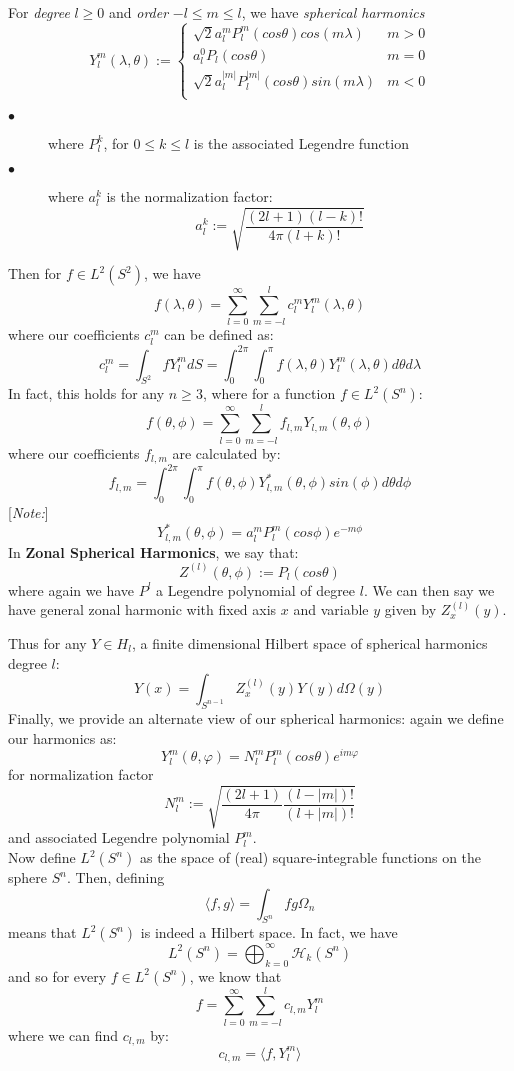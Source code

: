 \documentclass[12pt, leqno]{article}
\theoremstyle{plain}
\begin{document}
For \textit{degree} $l \geq 0$ and \textit{order} $-l \leq m \leq l$, we have \textit{spherical harmonics}
\[
Y^m_l(\lambda, \theta) := 
\begin{cases}
\sqrt{2}a^m_l P^m_l(cos \theta)cos(m\lambda) & m > 0\\
a^0_l P_l(cos \theta) & m = 0\\
\sqrt{2}a^{|m|}_l P^{|m|}_l(cos \theta)sin(m\lambda) & m < 0\\
\end{cases}
\]
\begin{description}
\item[$\bullet$] where $P^k_l$, for $0 \leq k \leq l$ is the associated Legendre function

\item[$\bullet$] where $a^k_l$ is the normalization factor:
\[
a^k_l := \sqrt{\frac{(2l+1)(l - k)!}{4\pi(l+k)!}}
\]
\end{description}

Then for $f \in L^2(S^2)$, we have
\[
f(\lambda, \theta) = \sum_{l = 0}^\infty \sum_{m = -l}^l c^m_l Y^m_l(\lambda, \theta)
\]
where our coefficients $c^m_l$ can be defined as:
\[
c^m_l = \int_{S^2}f Y^m_l dS = \int_0^{2\pi} \int_0^\pi f(\lambda, \theta)Y^m_l(\lambda, \theta)d\theta d\lambda
\]
In fact, this holds for any $n \geq 3$, where for a function $f \in L^2(S^n)$:
\[
f(\theta, \phi) = \sum_{l = 0}^\infty \sum_{m = -l}^l f_{l, m} Y_{l, m}(\theta, \phi)
\]
where our coefficients $f_{l, m}$ are calculated by:
\[
f_{l, m} = \int_0^{2\pi} \int_0^{\pi}f(\theta, \phi)Y^*_{l, m}(\theta, \phi)sin(\phi)d\theta d\phi
\]
[\textit{Note:}]
\[
Y^*_{l, m}(\theta, \phi) = a^m_l P^m_l(cos \phi)e^{-m\phi}
\]
In {\textbf{Zonal Spherical Harmonics}}, we say that:
\[
Z^{(l)}(\theta, \phi) := P_l(cos \theta)
\]
where again we have $P^l$ a Legendre polynomial of degree $l$. We can then say we have general zonal harmonic with fixed axis $x$ and variable $y$ given by $Z^{(l)}_x(y)$.

Thus for any $Y \in H_l$, a finite dimensional Hilbert space of spherical harmonics degree $l$:
\[
Y(x) = \int_{S^{n-1}} Z^{(l)}_x(y)Y(y)d\Omega(y)
\]
\newpage
Finally, we provide an alternate view of our spherical harmonics: again we define our harmonics as:
\[
Y^m_l(\theta, \varphi) = N^m_l P^m_l(cos \theta)e^{im\varphi}
\]
for normalization factor
\[
N^m_l := \sqrt{\frac{(2l + 1)}{4\pi}\frac{(l - |m|)!}{(l + |m|)!}}
\]
and associated Legendre polynomial $P^m_l$.\\

Now define $L^2(S^n)$ as the space of (real) square-integrable functions on the sphere $S^n$. Then, defining
\[
\langle f, g \rangle = \int_{S^n}fg\Omega_n
\]
means that $L^2(S^n)$ is indeed a Hilbert space. In fact, we have 
\[
L^2(S^n) = \bigoplus_{k=0}^\infty \mathcal{H}_k(S^n)
\]
and so for every $f \in L^2(S^n)$, we know that
\[
f = \sum_{l = 0}^{\infty} \sum_{m = -l}^l c_{l, m} Y^m_l
\]
where we can find $c_{l, m}$ by:
\[
c_{l, m} = \langle f, Y^m_l \rangle
\]
\end{document}
